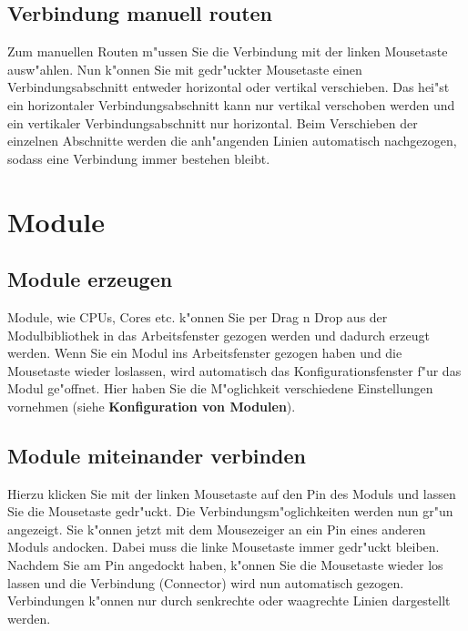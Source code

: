 \documentclass[a4paper,titlepage,12pt,ngerman]{scrbook}
\begin{document}
\subsection{Verbindung manuell routen}
Zum manuellen Routen m"ussen Sie die Verbindung mit der linken Mousetaste ausw"ahlen. Nun k"onnen Sie mit gedr"uckter Mousetaste einen Verbindungsabschnitt entweder horizontal oder vertikal verschieben. Das hei"st ein horizontaler Verbindungsabschnitt kann nur vertikal verschoben werden und ein vertikaler Verbindungsabschnitt nur horizontal. Beim Verschieben der einzelnen Abschnitte werden die anh"angenden Linien automatisch nachgezogen, sodass eine Verbindung immer bestehen bleibt.




\section{Module}

\subsection{Module erzeugen}
Module, wie CPUs, Cores etc. k"onnen Sie per Drag n Drop aus der Modulbibliothek in das Arbeitsfenster gezogen werden und dadurch erzeugt werden. Wenn Sie ein Modul ins Arbeitsfenster gezogen haben und die Mousetaste wieder loslassen, wird automatisch das Konfigurationsfenster f"ur das Modul ge"offnet. Hier haben Sie die M"oglichkeit verschiedene Einstellungen vornehmen (siehe {\bf Konfiguration von Modulen}).


\subsection{Module miteinander verbinden}
Hierzu klicken Sie mit der linken Mousetaste auf den Pin des Moduls und lassen Sie die Mousetaste gedr"uckt. Die Verbindungsm"oglichkeiten werden nun gr"un angezeigt. Sie k"onnen jetzt mit dem Mousezeiger an ein Pin eines anderen Moduls andocken. Dabei muss die linke Mousetaste immer gedr"uckt bleiben. Nachdem Sie am Pin angedockt haben, k"onnen Sie die Mousetaste wieder los lassen und die Verbindung (Connector) wird nun automatisch gezogen. Verbindungen k"onnen nur durch senkrechte oder waagrechte Linien dargestellt werden.
\end{document}
